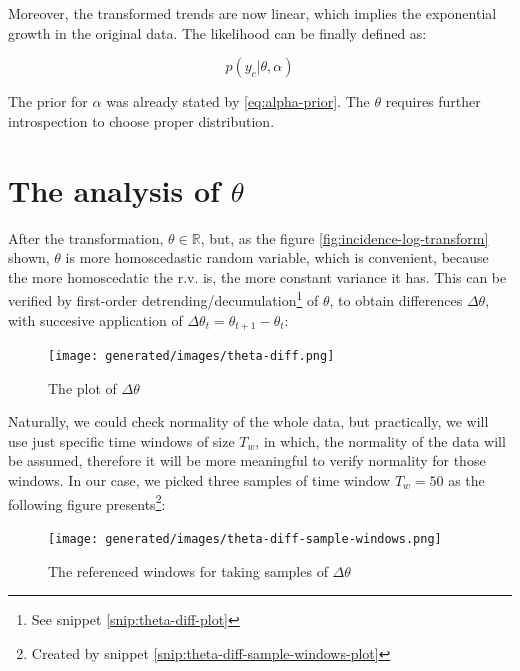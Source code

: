 \documentclass[
  digital, %
  oneside, %
  lof,     %
  lot,     %
]{fithesis4}
\begin{document}
Moreover, the transformed trends are now 
linear, which implies the exponential growth in the original data.
The likelihood can be finally defined as:

\begin{equation}\label{eq:likelihood-first}
  p( y_c | \theta, \alpha )
\end{equation}

The prior for $\alpha$ was already stated by \eqref{eq:alpha-prior}.
The $\theta$ requires further introspection to choose 
proper distribution.


\section{The analysis of \texorpdfstring{$\theta$}{Lg}}
\label{sec:theta-analysis}

After the transformation, $\theta \in \mathbb{R}$, but, 
as the figure \ref{fig:incidence-log-transform} 
shown, $\theta$ is more homoscedastic random variable, which is 
convenient, because the more homoscedatic 
the r.v. is, the more constant variance 
it has.
This can be verified by first-order detrending/decumulation\footnote{See snippet \ref{snip:theta-diff-plot}} 
of $\theta$, to obtain differences 
$\Delta \theta$, with succesive application of 
$\Delta \theta_t = \theta_{t+1} - \theta_{t}$:

\begin{figure}[H]
  \begin{center}
    \texttt{[image: generated/images/theta-diff.png]}
  \end{center}
  \caption{The plot of $\Delta \theta$}
  \label{fig:theta-diff}
\end{figure}

Naturally, we could check normality of the 
whole data, but practically, we will use just 
specific time windows of size $T_w$, in which, the normality of the data will be assumed,
therefore it will be more meaningful to verify normality for those 
windows. In our case, we picked three samples 
of time window $T_w = 50$ as the following figure 
presents\footnote{Created by snippet \ref{snip:theta-diff-sample-windows-plot}}:

\begin{figure}[H]
  \begin{center}
    \texttt{[image: generated/images/theta-diff-sample-windows.png]}
  \end{center}
  \caption{The referenced windows for taking samples of $\Delta \theta$}
  \label{fig:theta-sample-windows}
\end{figure}
\end{document}
